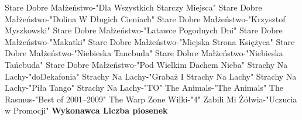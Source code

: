 \documentclass{article}
\begin{document}
{ Stare Dobre Małżeństwo-"Dla Wszystkich Starczy Miejsca"   \newline
 Stare Dobre Małżeństwo-"Dolina W Długich Cieniach"   \newline
 Stare Dobre Małżeństwo-"Krzysztof Myszkowski"   \newline
 Stare Dobre Małżeństwo-"Latawce Pogodnych Dni"   \newline
 Stare Dobre Małżeństwo-"Makatki"   \newline
 Stare Dobre Małżeństwo-"Miejska Strona Księżyca"   \newline
 Stare Dobre Małżeństwo-"Niebieska Tancbuda"   \newline
 Stare Dobre Małżeństwo-"Niebieska Tańcbuda"   \newline
 Stare Dobre Małżeństwo-"Pod Wielkim Dachem Nieba"   \newline
 Strachy Na Lachy-"doDekafonia"   \newline
 Strachy Na Lachy-"Grabaż I Strachy Na Lachy"   \newline
 Strachy Na Lachy-"Piła Tango"   \newline
 Strachy Na Lachy-"TO"   \newline
 The Animals-"The Animals"   \newline
 The Rasmus-"Best of 2001–2009"   \newline
 The Warp Zone   \newline
 Wilki-"4"   \newline
 Zabili Mi Żółwia-"Uczucia w Promocji"   \newline
\newpage\textbf{
Wykonawca \tab Liczba piosenek} 


}
\end{document}
